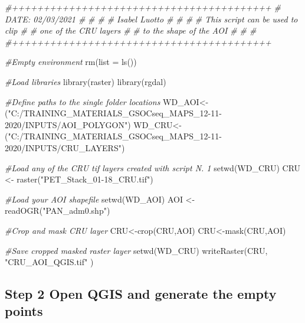 \documentclass[
  10pt,
  b5paper,
]{book}
\newenvironment{Shaded}{\begin{snugshade}}{\end{snugshade}}
\newcommand{\AttributeTok}[1]{\textcolor[rgb]{0.77,0.63,0.00}{#1}}
\newcommand{\CommentTok}[1]{\textcolor[rgb]{0.56,0.35,0.01}{\textit{#1}}}
\newcommand{\FunctionTok}[1]{\textcolor[rgb]{0.00,0.00,0.00}{#1}}
\newcommand{\NormalTok}[1]{#1}
\newcommand{\OtherTok}[1]{\textcolor[rgb]{0.56,0.35,0.01}{#1}}
\newcommand{\StringTok}[1]{\textcolor[rgb]{0.31,0.60,0.02}{#1}}
\begin{document}
\begin{Shaded}
\begin{Highlighting}[]
\CommentTok{\#+++++++++++++++++++++++++++++++++++++++++}
\CommentTok{\#  DATE:  02/03/2021                     \#}
\CommentTok{\#                                        \#}
\CommentTok{\#  Isabel Luotto                         \#}
\CommentTok{\#                                        \#}
\CommentTok{\# This script can be used to clip        \#}
\CommentTok{\# one of the CRU layers                  \#}
\CommentTok{\# to the shape of the AOI                \#}
\CommentTok{\#                                        \#}
\CommentTok{\#+++++++++++++++++++++++++++++++++++++++++}

\CommentTok{\#Empty environment}
\FunctionTok{rm}\NormalTok{(}\AttributeTok{list =} \FunctionTok{ls}\NormalTok{())}

\CommentTok{\#Load libraries}
\FunctionTok{library}\NormalTok{(raster)}
\FunctionTok{library}\NormalTok{(rgdal)}

\CommentTok{\#Define paths to the single folder locations}
\NormalTok{WD\_AOI}\OtherTok{\textless{}{-}}\NormalTok{(}\StringTok{"C:/TRAINING\_MATERIALS\_GSOCseq\_MAPS\_12{-}11{-}2020/INPUTS/AOI\_POLYGON"}\NormalTok{)}
\NormalTok{WD\_CRU}\OtherTok{\textless{}{-}}\NormalTok{(}\StringTok{"C:/TRAINING\_MATERIALS\_GSOCseq\_MAPS\_12{-}11{-}2020/INPUTS/CRU\_LAYERS"}\NormalTok{)}

\CommentTok{\#Load any of the CRU tif layers created with script N. 1}
\FunctionTok{setwd}\NormalTok{(WD\_CRU)}
\NormalTok{CRU }\OtherTok{\textless{}{-}} \FunctionTok{raster}\NormalTok{(}\StringTok{"PET\_Stack\_01{-}18\_CRU.tif"}\NormalTok{)}

\CommentTok{\#Load your AOI shapefile}
\FunctionTok{setwd}\NormalTok{(WD\_AOI)}
\NormalTok{AOI }\OtherTok{\textless{}{-}} \FunctionTok{readOGR}\NormalTok{(}\StringTok{"PAN\_adm0.shp"}\NormalTok{)}

\CommentTok{\#Crop and mask CRU layer}
\NormalTok{CRU}\OtherTok{\textless{}{-}}\FunctionTok{crop}\NormalTok{(CRU,AOI)}
\NormalTok{CRU}\OtherTok{\textless{}{-}}\FunctionTok{mask}\NormalTok{(CRU,AOI)}

\CommentTok{\#Save cropped masked raster layer}
\FunctionTok{setwd}\NormalTok{(WD\_CRU)}
\FunctionTok{writeRaster}\NormalTok{(CRU, }\StringTok{"CRU\_AOI\_QGIS.tif"}\NormalTok{ )}
\end{Highlighting}
\end{Shaded}

\hypertarget{step-2-open-qgis-and-generate-the-empty-points}{%
\subsection*{Step 2 Open QGIS and generate the empty points}\label{step-2-open-qgis-and-generate-the-empty-points}}
\end{document}
